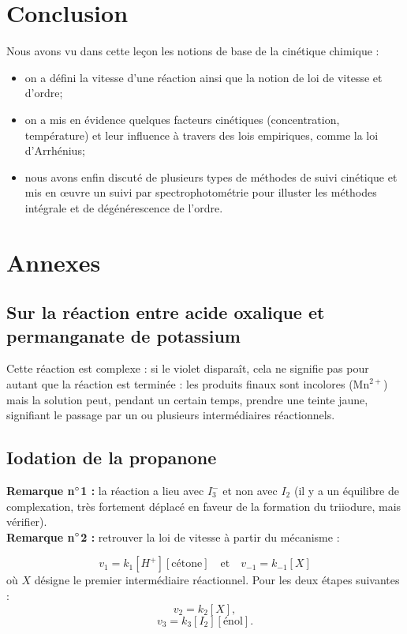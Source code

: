 \documentclass[11pt,a4paper]{report}
\begin{document}
\section*{Conclusion}
Nous avons vu dans cette leçon les notions de base de la cinétique chimique : 
\begin{itemize}
	\item on a défini la vitesse d'une réaction ainsi que la notion de loi de vitesse et d'ordre;
	\item on a mis en évidence quelques facteurs cinétiques (concentration, température) et leur influence à travers des lois empiriques, comme la loi d'Arrhénius;
	\item nous avons enfin discuté de plusieurs types de méthodes de suivi cinétique et mis en œuvre un suivi par spectrophotométrie pour illuster les méthodes intégrale et de dégénérescence de l'ordre.
\end{itemize}


\newpage
\section*{Annexes}
\subsection{Sur la réaction entre acide oxalique et permanganate de potassium}

Cette réaction est complexe : si le violet disparaît, cela ne signifie pas pour autant que la réaction est terminée : les produits finaux sont incolores ($\text{Mn}^{2+}$) mais la solution peut, pendant un certain temps, prendre une teinte jaune, signifiant le passage par un ou plusieurs intermédiaires réactionnels.

\subsection{Iodation de la propanone}

\textbf{Remarque n$\degree$1 :} la réaction a lieu avec $I_3^-$ et non avec $I_2$ (il y a un équilibre de complexation, très fortement déplacé en faveur de la formation du triiodure, mais vérifier).\\

\textbf{Remarque n$\degree$2 :} retrouver la loi de vitesse à partir du mécanisme :

\begin{equation}
	v_1 = k_1[H^+][\text{cétone}] \quad\text{et}\quad v_{-1} = k_{-1}[X]
\end{equation}
où $X$ désigne le premier intermédiaire réactionnel. Pour les deux étapes suivantes :
\begin{equation}
	v_2 = k_2 [X],
\end{equation}
\begin{equation}
	v_3 = k_3[I_2][\text{énol}].
\end{equation}
\end{document}
